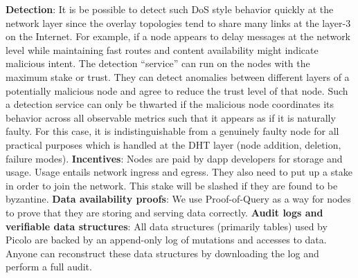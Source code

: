\documentclass[preprint,10pt]{elsarticle}
\begin{document}
\textbf{Detection}: It is be possible to detect such DoS style behavior quickly at the network layer since the overlay topologies tend to share many links at the layer-3 on the Internet. For example, if a node appears to delay messages at the network level while maintaining fast routes and content availability might indicate malicious intent. The detection “service” can run on the nodes with the maximum stake or trust. They can detect anomalies between different layers of a potentially malicious node and agree to reduce the trust level of that node. Such a detection service can only be thwarted if the malicious node coordinates its behavior across all observable metrics such that it appears as if it is naturally faulty. For this case, it is indistinguishable from a genuinely faulty node for all practical purposes which is handled at the DHT layer (node addition, deletion, failure modes).
\newline
\newline
\textbf{Incentives}: Nodes are paid by dapp developers for storage and usage. Usage entails network ingress and egress. They also need to put up a stake in order to join the network. This stake will be slashed if they are found to be byzantine.
\newline
\newline
\textbf{Data availability proofs}: We use Proof-of-Query as a way for nodes to prove that they are storing and serving data correctly.
\newline
\newline
\textbf{Audit logs and verifiable data structures}: All data structures (primarily tables) used by Picolo are backed by an append-only log of mutations and accesses to data. Anyone can reconstruct these data structures by downloading the log and perform a full audit.
\end{document}
